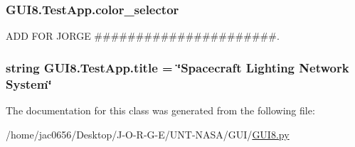 \subsubsection[{\texorpdfstring{color\+\_\+selector}{color_selector}}]{\setlength{\rightskip}{0pt plus 5cm}G\+U\+I8.\+Test\+App.\+color\+\_\+selector}\hypertarget{classGUI8_1_1TestApp_aead69a0b4419bbaa10eed9063007b648}{}\label{classGUI8_1_1TestApp_aead69a0b4419bbaa10eed9063007b648}


A\+DD F\+OR J\+O\+R\+GE \#\#\#\#\#\#\#\#\#\#\#\#\#\#\#\#\#\#\#\#\#\#. 

\subsubsection[{\texorpdfstring{title}{title}}]{\setlength{\rightskip}{0pt plus 5cm}string G\+U\+I8.\+Test\+App.\+title = \char`\"{}Spacecraft Lighting Network System\char`\"{}\hspace{0.3cm}{\ttfamily [static]}}\hypertarget{classGUI8_1_1TestApp_a4763321ddfa92947fcf3c8501848ab75}{}\label{classGUI8_1_1TestApp_a4763321ddfa92947fcf3c8501848ab75}


The documentation for this class was generated from the following file\+:\begin{DoxyCompactItemize}
\item 
/home/jac0656/\+Desktop/\+J-\/\+O-\/\+R-\/\+G-\/\+E/\+U\+N\+T-\/\+N\+A\+S\+A/\+G\+U\+I/\hyperlink{GUI8_8py}{G\+U\+I8.\+py}\end{DoxyCompactItemize}
